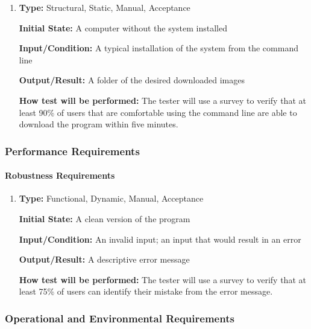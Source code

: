 \documentclass[12pt, titlepage]{article}
\begin{document}
\begin{enumerate}[label=NFR-LR\arabic*:, wide=0pt, leftmargin=*]

\item \phantom{empty}

\textbf{Type:} Structural, Static, Manual, Acceptance
					
\textbf{Initial State:} A computer without the system installed
					
\textbf{Input/Condition:} A typical installation of the system from the command line
					
\textbf{Output/Result:} A folder of the desired downloaded images
					
\textbf{How test will be performed:} The tester will use a survey to verify that at least 90\% of users that are comfortable using the command line are able to download the program within five minutes.

\end{enumerate}

\subsubsection{Performance Requirements}
\label{PerfReqs}
		
\paragraph{Robustness Requirements}

\begin{enumerate}[label=NFR-RR\arabic*:, wide=0pt, leftmargin=*]

\item \phantom{empty}

\textbf{Type:} Functional, Dynamic, Manual, Acceptance
					
\textbf{Initial State:} A clean version of the program
					
\textbf{Input/Condition:} An invalid input; an input that would result in an error
					
\textbf{Output/Result:} A descriptive error message
					
\textbf{How test will be performed:} The tester will use a survey to verify that at least 75\% of users can identify their mistake from the error message.

\end{enumerate}

\subsubsection{Operational and Environmental Requirements}
		
\end{document}
